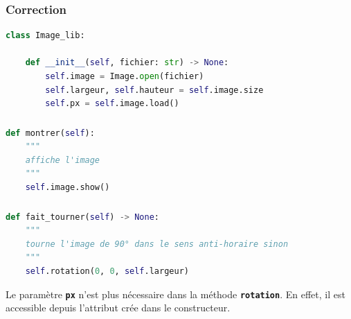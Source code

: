\documentclass[svgnames,11pt]{beamer}
\begin{document}
\begin{frame}[fragile]
    \frametitle{Correction}

    \begin{center}
        \begin{lstlisting}[language=Python , basicstyle=\ttfamily\small, xleftmargin=2em, xrightmargin=2em]
class Image_lib:

    def __init__(self, fichier: str) -> None:
        self.image = Image.open(fichier)
        self.largeur, self.hauteur = self.image.size
        self.px = self.image.load()
\end{lstlisting}
        \label{CODE}
    \end{center}

\end{frame}
\begin{frame}[fragile]
    \frametitle{}

    \begin{center}
        \begin{lstlisting}[language=Python , basicstyle=\ttfamily\small, xleftmargin=2em, xrightmargin=2em]
def montrer(self):
    """
    affiche l'image
    """
    self.image.show()
\end{lstlisting}
        \label{CODE}
    \end{center}

\end{frame}
\begin{frame}[fragile]
    \frametitle{}

    \begin{center}
        \begin{lstlisting}[language=Python , basicstyle=\ttfamily\small, xleftmargin=2em, xrightmargin=2em]
def fait_tourner(self) -> None:
    """
    tourne l'image de 90° dans le sens anti-horaire sinon
    """
    self.rotation(0, 0, self.largeur)
\end{lstlisting}
        \label{CODE}
    \end{center}
    \begin{aretenir}[Remarque]
        Le paramètre \textbf{\texttt{px}} n'est plus nécessaire dans la méthode \textbf{\texttt{rotation}}. En effet, il est accessible depuis l'attribut crée dans le constructeur.
    \end{aretenir}
\end{frame}
\end{document}
